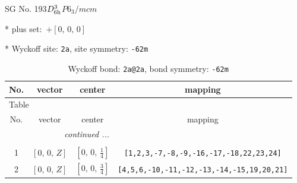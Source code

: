 \documentclass[fleqn,8pt]{jsarticle}
\begin{document}
\setcounter{MaxMatrixCols}{32}

\renewcommand{\tablename}{Table~}
\renewcommand{\figurename}{Figure~}
\begin{center}
\LARGE
SG No. 193\quad$D_{\rm 6h}^{3}$\quad$P6_3/mcm$\quad[ hexagonal ]
\end{center}

* plus set:\,\,\,$+\left[ 0,\, 0,\, 0 \right]$


* Wyckoff site: {\tt 2a}, site symmetry: {\tt -62m}
\renewcommand{\arraystretch}{1.2}
\begin{longtable}{cccc}
\caption{Wyckoff bond: {\tt 2a@2a}, bond symmetry: {\tt -62m}}
 \\
 \hline \hline
No. & vector & center & mapping \\ \hline \endfirsthead

\multicolumn{3}{l}{\tablename\ \thetable{}} \\
 \hline \hline
No. & vector & center & mapping \\ \hline \endhead

 \hline \hline
\multicolumn{3}{r}{\footnotesize\it continued ...} \\ \endfoot

 \hline \hline
\multicolumn{3}{r}{} \\ \endlastfoot

1 & $\left[ 0,\, 0,\, Z \right]$ & $\left[ 0,\, 0,\, \frac{1}{4} \right]$ & {\tt [1,2,3,-7,-8,-9,-16,-17,-18,22,23,24]} \\ \hline
2 & $\left[ 0,\, 0,\, Z \right]$ & $\left[ 0,\, 0,\, \frac{3}{4} \right]$ & {\tt [4,5,6,-10,-11,-12,-13,-14,-15,19,20,21]} \\
\end{longtable}
\renewcommand{\arraystretch}{1.2}
\end{document}
